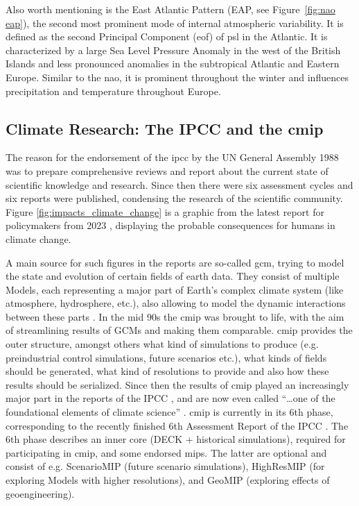 Also worth mentioning is the East Atlantic Pattern (EAP, see Figure~\ref{fig:nao eap}), the second most prominent mode of internal atmospheric variability.
It is defined as the second Principal Component (\ac{eof}) of \ac{psl} in the Atlantic.  
It is characterized by a large Sea Level Pressure Anomaly in the west of the British Islands and less pronounced  anomalies in the subtropical Atlantic and Eastern Europe. 
Similar to the \ac{nao}, it is prominent throughout the winter and influences precipitation and temperature throughout Europe. \cite{comas-bru_effect_2016, song_east_2019}

\subsection{Climate Research: The IPCC and the \ac{cmip}}
\label{sec:climate research}


The reason for the endorsement of the \ac{ipcc} by the UN General Assembly 1988 was to prepare comprehensive reviews and report about the current state of scientific knowledge and research. 
Since then there were six assessment cycles and six reports were published, condensing the research of the scientific community. Figure \ref{fig:impacts_climate_change} is a graphic from the latest report for policymakers from 2023 \cite{lee2024climate}, displaying the probable consequences for humans in climate change.

A main source for such figures in the reports are so-called \ac{gcm}, trying to model the state and evolution of certain fields of earth data.
They consist of multiple Models, each representing a major part of Earth's complex climate system (like atmosphere, hydrosphere, etc.), also allowing to model the dynamic interactions between these parts \cite{vietinghoffdiss}. 
In the mid 90s the \ac{cmip} was brought to life, with the aim of streamlining results of GCMs and making them comparable. 
\ac{cmip} provides the outer structure, amongst others what kind of simulations to produce (e.g. preindustrial control simulations, future scenarios etc.), what kinds of fields should be generated, what kind of resolutions to provide and also how these results should be serialized.
Since then the results of \ac{cmip} played an increasingly major part in the reports of the IPCC \cite{touzepeiffer_coupled_2020}, and are now even called \enquote{\dots one of the foundational elements of climate science} \cite{eyring_overview_2016}. 
\ac{cmip} is currently in its 6th phase, corresponding to the recently finished 6th Assessment Report of the IPCC \cite{lee2024climate}. 
The 6th phase describes an inner core (DECK + historical simulations), required for participating in \ac{cmip}, and some endorsed \acp{mip}. 
The latter are optional and consist of e.g. ScenarioMIP (future scenario simulations), HighResMIP (for exploring Models with higher resolutions), and GeoMIP (exploring effects of geoengineering).

